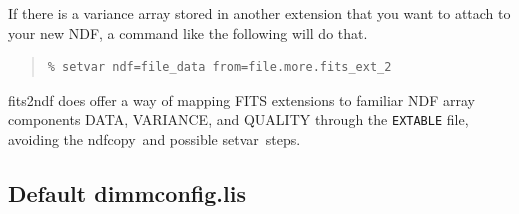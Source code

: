 \documentclass[twoside,11pt]{article}
\newcommand{\xref}[3]{#1}
\newcommand{\xlabel}[1]{}
\renewcommand{\_}{\texttt{\symbol{95}}}
\newenvironment{myquote}{
   \color{MidnightBlue}\begin{quote}\begin{small}}{
   \end{small}\end{quote}
}
\newcommand{\task}[1]{\textsf{#1}}
\newcommand{\param}[1]{\texttt{#1}}
\newcommand{\ndfcopy}{\xref{\task{ndfcopy}}{sun95}{NDFCOPY}}
\newcommand{\setvar}{\xref{\task{setvar}}{sun95}{SETVAR}}
\renewenvironment{myquote}{
      \begin{quote}\begin{small}}{
      \end{small}\end{quote}
   }
\begin{document}
If there is a variance array stored in another extension that you want
to attach to your new NDF, a command like the following will do that.

\begin{myquote}
\begin{verbatim}
% setvar ndf=file_data from=file.more.fits_ext_2
\end{verbatim}
\end{myquote}

\task{fits2ndf} does offer a way of mapping FITS extensions to familiar NDF
array components DATA, VARIANCE, and QUALITY through the \param{EXTABLE} file,
avoiding the \ndfcopy\ and possible \setvar\ steps.


\newpage
\subsection{\xlabel{defconfig}Default dimmconfig.lis}
\label{app:dimm}
\raggedbottom
\end{document}

